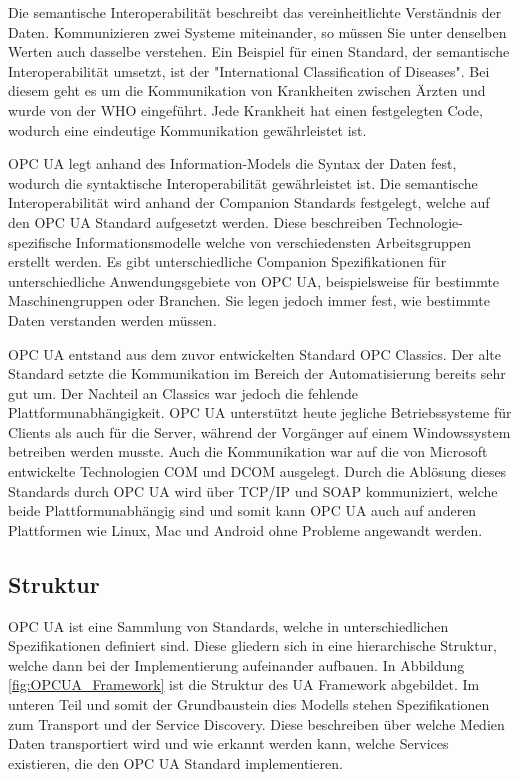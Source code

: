 \documentclass[a4paper, 12pt, oneside, toc=listofnumbered, bibliography=totoc]{scrbook}
\begin{document}
	 Die semantische Interoperabilität beschreibt das vereinheitlichte Verständnis der Daten. Kommunizieren zwei Systeme miteinander, so müssen Sie unter denselben Werten auch dasselbe verstehen. Ein Beispiel für einen Standard, der semantische Interoperabilität umsetzt, ist der "International Classification of Diseases". Bei diesem geht es um die Kommunikation von Krankheiten zwischen Ärzten und wurde von der WHO eingeführt. Jede Krankheit hat einen festgelegten Code, wodurch eine eindeutige Kommunikation gewährleistet ist. \cite{mielebacher_verteilte_2021-1}
	 
  	 OPC UA legt anhand des Information-Models die Syntax der Daten fest, wodurch die syntaktische Interoperabilität gewährleistet ist. Die semantische Interoperabilität wird anhand der Companion Standards festgelegt, welche auf den OPC UA Standard aufgesetzt werden. Diese beschreiben Technologie-spezifische Informationsmodelle welche von verschiedensten Arbeitsgruppen erstellt werden. Es gibt unterschiedliche Companion Spezifikationen für unterschiedliche Anwendungsgebiete von OPC UA, beispielsweise für bestimmte Maschinengruppen oder Branchen. Sie legen jedoch immer fest, wie bestimmte Daten verstanden werden müssen. \cite{noauthor_machinery_nodate-1}
	 
	 OPC UA entstand aus dem zuvor entwickelten Standard OPC Classics. Der alte Standard setzte die Kommunikation im Bereich der Automatisierung bereits sehr gut um. Der Nachteil an Classics war jedoch die fehlende Plattformunabhängigkeit. OPC UA unterstützt heute jegliche Betriebssysteme für Clients als auch für die Server, während der Vorgänger auf einem Windowssystem betreiben werden musste. Auch die Kommunikation war auf die von Microsoft entwickelte Technologien \ac{COM} und \ac{DCOM} ausgelegt. Durch die Ablösung dieses Standards durch OPC UA wird über TCP/IP und SOAP kommuniziert, welche beide Plattformunabhängig sind und somit kann OPC UA auch auf anderen Plattformen wie Linux, Mac und Android ohne Probleme angewandt werden. \cite{mielebacher_verteilte_2021-1}
	
		\subsection{Struktur}
		
		OPC UA ist eine Sammlung von Standards, welche in unterschiedlichen Spezifikationen definiert sind. Diese gliedern sich in eine hierarchische Struktur, welche dann bei der Implementierung aufeinander aufbauen. In Abbildung \ref{fig:OPCUA_Framework} ist die Struktur des UA Framework abgebildet. Im unteren Teil und somit der Grundbaustein dies Modells stehen Spezifikationen zum Transport und der Service Discovery. Diese beschreiben über welche Medien Daten transportiert wird und wie erkannt werden kann, welche Services existieren, die den OPC UA Standard implementieren. \cite{mahnke_opc_2009, rinke_was_2022}
		
\end{document}
